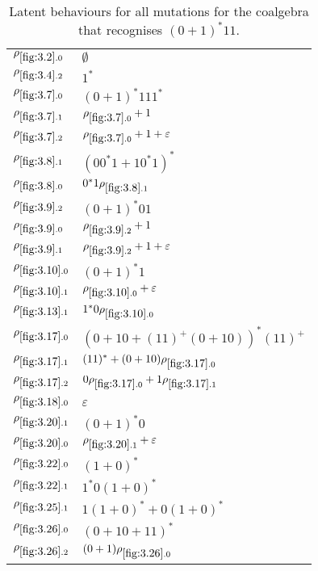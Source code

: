 \begin{example}
\begin{table}[t]
\centering
\begin{tabular}{|l | l | }
\hline
$\rho_{\ref{fig:3.2}.0}$ &  $\emptyset$   \\
$\rho_{\ref{fig:3.4}.2}$ &  $1^*$ \\
$\rho_{\ref{fig:3.7}.0}$ &  $(0+1)^*111^*$\\%
$\rho_{\ref{fig:3.7}.1}$ &  $\rho_{\ref{fig:3.7}.0}+1$ \\
$\rho_{\ref{fig:3.7}.2}$ &  $\rho_{\ref{fig:3.7}.0}+1+\varepsilon$ \\
$\rho_{\ref{fig:3.8}.1}$ &  $(00^*1+10^*1)^*$ \\
$\rho_{\ref{fig:3.8}.0}$ &  $0^*1\rho_{\ref{fig:3.8}.1}$ \\
$\rho_{\ref{fig:3.9}.2}$& $(0+1)^*01$\\
$\rho_{\ref{fig:3.9}.0}$&   $\rho_{\ref{fig:3.9}.2}+1$\\
$\rho_{\ref{fig:3.9}.1}$&   $\rho_{\ref{fig:3.9}.2}+1+\varepsilon$\\
$\rho_{\ref{fig:3.10}.0}$ &  $(0+1)^*1$ \\
$\rho_{\ref{fig:3.10}.1}$ &  $\rho_{\ref{fig:3.10}.0}+\varepsilon$ \\
$\rho_{\ref{fig:3.13}.1}$ &  $1^*0\rho_{\ref{fig:3.10}.0}$ \\
$\rho_{\ref{fig:3.17}.0}$ &  $(0+10+(11)^+(0+10))^*(11)^+$ \\
$\rho_{\ref{fig:3.17}.1}$ &  $(11)^*+(0+10)\rho_{\ref{fig:3.17}.0}$ \\
$\rho_{\ref{fig:3.17}.2}$ &  $0\rho_{\ref{fig:3.17}.0}+1\rho_{\ref{fig:3.17}.1}$ \\
$\rho_{\ref{fig:3.18}.0}$ &  $\varepsilon$ \\
$\rho_{\ref{fig:3.20}.1}$ &  $(0+1)^*0$ \\
$\rho_{\ref{fig:3.20}.0}$ &  $\rho_{\ref{fig:3.20}.1}+\varepsilon$ \\
$\rho_{\ref{fig:3.22}.0}$ &  $(1+0)^*$ \\
$\rho_{\ref{fig:3.22}.1}$ &  $1^*0(1+0)^*$ \\
$\rho_{\ref{fig:3.25}.1}$ &  $1(1+0)^*+0(1+0)^*$ \\
$\rho_{\ref{fig:3.26}.0}$ &  $(0+10+11)^*$ \\
$\rho_{\ref{fig:3.26}.2}$ &  $(0+1)\rho_{\ref{fig:3.26}.0}$\\
\hline
\end{tabular}
\caption{Latent behaviours for all mutations for the coalgebra that recognises $(0+1)^*11$. }
\label{tab:ExampleLatentBehaviours}
\end{table}


\end{example}
